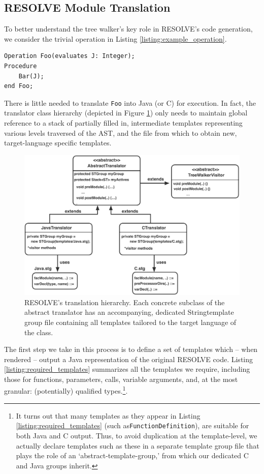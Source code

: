 \documentclass[times]{speauth}
\begin{document}
\subsection{RESOLVE Module Translation}

To better understand the tree walker's key role in RESOLVE's code generation, we consider the trivial operation in Listing \ref{listing:example_operation}.

\begin{lstlisting}[caption={A RESOLVE example operation.},label={listing:example_operation}]
Operation Foo(evaluates J: Integer);
Procedure
	Bar(J);
end Foo;
\end{lstlisting}

There is little needed to translate \texttt{Foo} into Java (or C) for execution. In fact, the translator class hierarchy (depicted in Figure \ref{fig:translation_uml}) only needs to maintain global reference to a stack of partially filled in, intermediate templates representing various levels traversed of the AST, and the file from which to obtain new, target-language specific templates.

\begin{figure}[!htb]
\centering
\includegraphics[scale=.40]{figures/translation_uml.pdf}
\caption{RESOLVE's translation hierarchy. Each concrete subclass of the abstract translator has an accompanying, dedicated Stringtemplate group file containing all templates tailored to the target language of the class.}
\label{fig:translation_uml}
\end{figure}

The first step we take in this process is to define a set of templates which -- when rendered -- output a Java representation of the original RESOLVE code. Listing \ref{listing:required_templates} summarizes all the templates we require, including those for functions, parameters, calls, variable arguments, and, at the most granular: (potentially) qualified types.\footnote{It turns out that many templates as they appear in Listing \ref{listing:required_templates} (such as\texttt{FunctionDefinition}), are suitable for both Java and C output. Thus, to avoid duplication at the template-level, we actually declare templates such as these in a separate template group file that plays the role of an `abstract-template-group,' from which our dedicated C and Java groups inherit.}.
\end{document}
